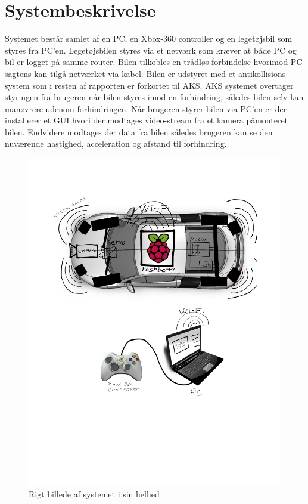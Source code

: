 \chapter{Systembeskrivelse} \label{ch:Systembeskrivelse}

Systemet består samlet af en PC, en Xbox-360 controller og en legetøjsbil som styres fra PC'en. Legetøjsbilen styres via et netværk som kræver at både PC og bil er logget på samme router. Bilen tilkobles en trådløs forbindelse hvorimod PC sagtens kan tilgå netværket via kabel. Bilen er udstyret med et antikollisions system som i resten af rapporten er forkortet til AKS. AKS systemet overtager styringen fra brugeren når bilen styres imod en forhindring, således bilen selv kan manøvrere udenom forhindringen. Når brugeren styrer bilen via PC'en er der installerer et GUI hvori der modtages video-stream fra et kamera påmonteret bilen. Endvidere modtages der data fra bilen således brugeren kan se den nuværende hastighed, acceleration og afstand til forhindring. 

\begin{figure}[h]
\centering
\includegraphics[width=\textwidth - 7.38 cm]{../fig/billeder/rigbillede}
\caption{Rigt billede af systemet i sin helhed}
\label{fig:rigbillede}
\end{figure} 

